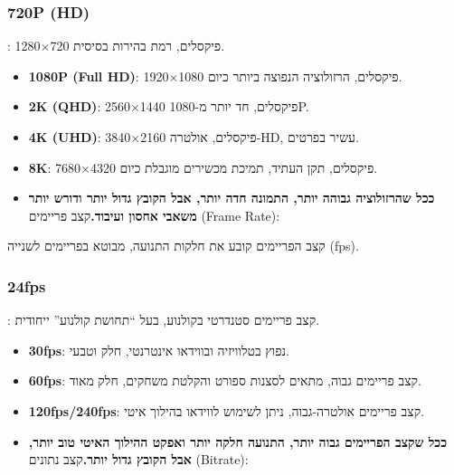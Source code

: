 


\subsubsection*{720P (HD)}

: 1280×720 פיקסלים, רמת בהירות בסיסית.

\begin{itemize}
  \item \textbf{1080P (Full HD)}: 1920×1080 פיקסלים, הרזולוציה הנפוצה ביותר כיום.
  \item \textbf{2K (QHD)}: 2560×1440 פיקסלים, חד יותר מ-1080P.
  \item \textbf{4K (UHD)}: 3840×2160 פיקסלים, אולטרה-HD, עשיר בפרטים.
  \item \textbf{8K}: 7680×4320 פיקסלים, תקן העתיד, תמיכת מכשירים מוגבלת כיום.
  \item \textbf{ככל שהרזולוציה גבוהה יותר, התמונה חדה יותר, אבל הקובץ גדול יותר ודורש יותר משאבי אחסון ועיבוד.}קצב פריימים (Frame Rate):
\end{itemize}

קצב הפריימים קובע את חלקות התנועה, מבוטא בפריימים לשנייה (fps).

\subsubsection*{24fps}

: קצב פריימים סטנדרטי בקולנוע, בעל “תחושת קולנוע” ייחודית.

\begin{itemize}
  \item \textbf{30fps}: נפוץ בטלוויזיה ובווידאו אינטרנטי, חלק וטבעי.
  \item \textbf{60fps}: קצב פריימים גבוה, מתאים לסצנות ספורט והקלטת משחקים, חלק מאוד.
  \item \textbf{120fps/240fps}: קצב פריימים אולטרה-גבוה, ניתן לשימוש לווידאו בהילוך איטי.
  \item \textbf{ככל שקצב הפריימים גבוה יותר, התנועה חלקה יותר ואפקט ההילוך האיטי טוב יותר, אבל הקובץ גדול יותר.}קצב נתונים (Bitrate):
\end{itemize}

